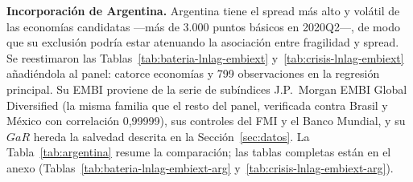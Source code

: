 \textbf{Incorporación de Argentina.}\label{sec:robustez-argentina} Argentina tiene el spread más alto y volátil de las economías candidatas ---más de 3.000 puntos básicos en 2020Q2---, de modo que su exclusión podría estar atenuando la asociación entre fragilidad y spread. Se reestimaron las Tablas~\ref{tab:bateria-lnlag-embiext} y~\ref{tab:crisis-lnlag-embiext} añadiéndola al panel: catorce economías y 799 observaciones en la regresión principal. Su EMBI proviene de la serie de subíndices J.P.\ Morgan EMBI Global Diversified (la misma familia que el resto del panel, verificada contra Brasil y México con correlación 0,99999), sus controles del FMI y el Banco Mundial, y su $GaR$ hereda la salvedad descrita en la Sección~\ref{sec:datos}. La Tabla~\ref{tab:argentina} resume la comparación; las tablas completas están en el anexo (Tablas~\ref{tab:bateria-lnlag-embiext-arg} y~\ref{tab:crisis-lnlag-embiext-arg}).

